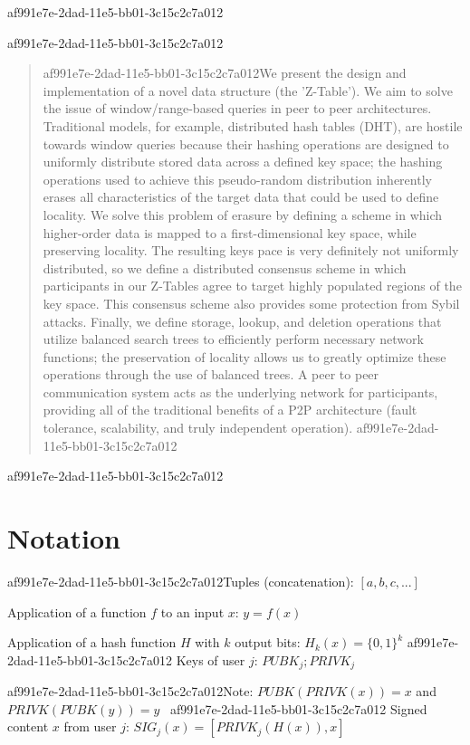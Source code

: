 \documentclass[12pt]{article}
\begin{document}
af991e7e-2dad-11e5-bb01-3c15c2c7a012\maketitle
af991e7e-2dad-11e5-bb01-3c15c2c7a012
\begin{abstract}
af991e7e-2dad-11e5-bb01-3c15c2c7a012We present the design and implementation of a novel data structure (the 'Z-Table'). We aim to solve the issue of window/range-based queries in peer to peer architectures. Traditional models, for example,  distributed hash tables (DHT), are hostile towards window queries because their hashing operations are designed to uniformly distribute stored data across a defined key space; the hashing operations used to achieve this pseudo-random distribution inherently erases all characteristics of the target data that could be used to define locality. We solve this problem of erasure by defining a scheme in which higher-order data is mapped to a first-dimensional key space, while preserving locality. The resulting keys pace is very definitely not uniformly distributed, so we define a distributed consensus scheme in which participants in our Z-Tables agree to target highly populated regions of the key space. This consensus scheme also provides some protection from Sybil attacks. Finally, we define storage, lookup, and deletion operations that utilize balanced search trees to efficiently perform necessary network functions; the preservation of locality allows us to greatly optimize these operations through the use of balanced trees. A peer to peer communication system acts as the underlying network for participants, providing all of the traditional benefits of a P2P architecture (fault tolerance, scalability, and truly independent operation).
af991e7e-2dad-11e5-bb01-3c15c2c7a012\end{abstract}

af991e7e-2dad-11e5-bb01-3c15c2c7a012\section{Notation}

af991e7e-2dad-11e5-bb01-3c15c2c7a012Tuples (concatenation): $[a,b,c,...]$

Application of a function $f$ to an input $x$: $y=f(x)$

Application of a hash function $H$ with $k$ output bits: $H_{k}(x) = \{0,1\}^k$
af991e7e-2dad-11e5-bb01-3c15c2c7a012
Keys of user $j$: $ PUBK_j; PRIVK_j $

af991e7e-2dad-11e5-bb01-3c15c2c7a012Note: $PUBK(PRIVK(x)) = x$ and $PRIVK(PUBK(y)) = y$~
af991e7e-2dad-11e5-bb01-3c15c2c7a012
Signed content $x$ from user $j$: $SIG_j(x) = \left[ PRIVK_j( H(x) ), x \right]$
\end{document}
